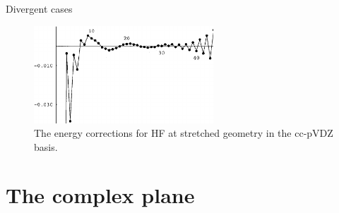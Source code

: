 \documentclass[xcolor=x11names,compress]{beamer}
\renewcommand{\(}{\begin{columns}}
\renewcommand{\)}{\end{columns}}
\newcommand{\<}[1]{\begin{column}{#1}}
\renewcommand{\>}{\end{column}}
\begin{document}
\begin{frame}{Divergent cases}
  
\begin{figure}
    \centering
    \includegraphics[width=0.6\textwidth]{The-energy-corrections-for-HF-at-stretched-geometry-in-the-cc-pVDZ-basis.png}
    \caption{The energy corrections for HF at stretched geometry in the cc-pVDZ basis.}
    \label{fig:my_label}
\end{figure}
    

\end{frame}

\section{The complex plane}
\end{document}
